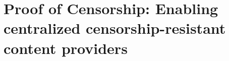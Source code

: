 


\newcommand{\imm}[1]{\textcolor{blue}{IMM:#1}}
\newcommand{\ewust}[1]{\textcolor{green}{ewust:#1}}
\newcommand{\tim}[1]{\textcolor{red}{TIM:#1}}

\chapter{Proof of Censorship: Enabling centralized censorship-resistant content providers}







